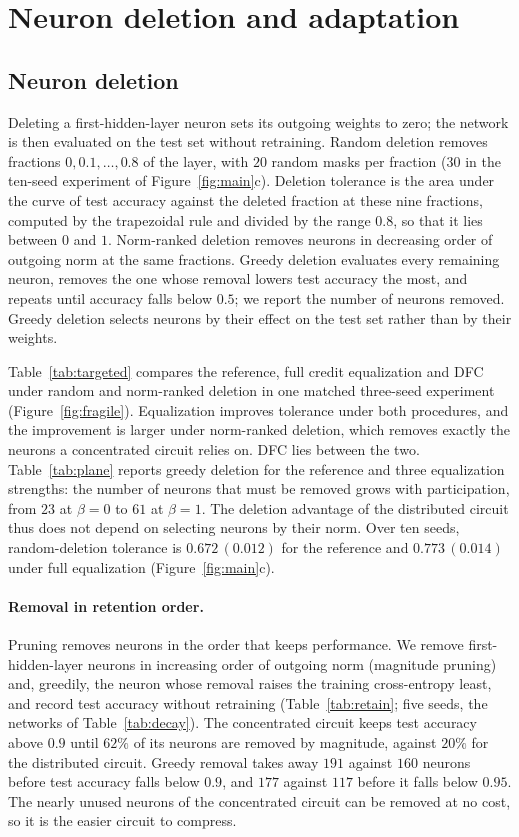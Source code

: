 \documentclass{article} %
\begin{document}
\section{Neuron deletion and adaptation}
\label{app:consequences}

\subsection{Neuron deletion}
\label{app:deletion}
Deleting a first-hidden-layer neuron sets its outgoing weights to zero; the network is then evaluated on the test set without retraining. Random deletion removes fractions $0, 0.1, \ldots, 0.8$ of the layer, with $20$ random masks per fraction ($30$ in the ten-seed experiment of Figure~\ref{fig:main}c). Deletion tolerance is the area under the curve of test accuracy against the deleted fraction at these nine fractions, computed by the trapezoidal rule and divided by the range $0.8$, so that it lies between $0$ and $1$. Norm-ranked deletion removes neurons in decreasing order of outgoing norm at the same fractions. Greedy deletion evaluates every remaining neuron, removes the one whose removal lowers test accuracy the most, and repeats until accuracy falls below $0.5$; we report the number of neurons removed. Greedy deletion selects neurons by their effect on the test set rather than by their weights.

Table~\ref{tab:targeted} compares the reference, full credit equalization and DFC under random and norm-ranked deletion in one matched three-seed experiment (Figure~\ref{fig:fragile}). Equalization improves tolerance under both procedures, and the improvement is larger under norm-ranked deletion, which removes exactly the neurons a concentrated circuit relies on. DFC lies between the two. Table~\ref{tab:plane} reports greedy deletion for the reference and three equalization strengths: the number of neurons that must be removed grows with participation, from $23$ at $\beta = 0$ to $61$ at $\beta = 1$. The deletion advantage of the distributed circuit thus does not depend on selecting neurons by their norm. Over ten seeds, random-deletion tolerance is $0.672\,(0.012)$ for the reference and $0.773\,(0.014)$ under full equalization (Figure~\ref{fig:main}c).

\paragraph{Removal in retention order.} Pruning removes neurons in the order that keeps performance. We remove first-hidden-layer neurons in increasing order of outgoing norm (magnitude pruning) and, greedily, the neuron whose removal raises the training cross-entropy least, and record test accuracy without retraining (Table~\ref{tab:retain}; five seeds, the networks of Table~\ref{tab:decay}). The concentrated circuit keeps test accuracy above $0.9$ until $62\%$ of its neurons are removed by magnitude, against $20\%$ for the distributed circuit. Greedy removal takes away $191$ against $160$ neurons before test accuracy falls below $0.9$, and $177$ against $117$ before it falls below $0.95$. The nearly unused neurons of the concentrated circuit can be removed at no cost, so it is the easier circuit to compress.
\end{document}
